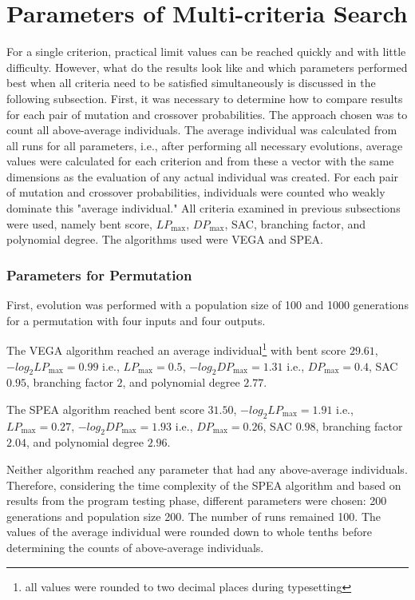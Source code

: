 \section{Parameters of Multi-criteria Search}
For a single criterion, practical limit values can be reached quickly and with little difficulty.
However, what do the results look like and which parameters performed best when
all criteria need to be satisfied simultaneously is discussed in the following subsection.
First, it was necessary to determine how to compare results for each pair of mutation and crossover probabilities.
The approach chosen was to count
all above-average individuals.
The average individual was calculated from all runs for all parameters, i.e., after performing
all necessary evolutions, average values were calculated for each criterion and from these
a vector with the same dimensions as the evaluation of any actual individual was created.
For each pair of mutation and crossover probabilities, individuals were counted
who weakly dominate this "average individual."
All criteria examined in previous subsections were used,
namely bent score, $LP_{\max}$, $DP_{\max}$, SAC, branching factor, and polynomial degree.
The algorithms used were VEGA and SPEA.

\subsubsection{Parameters for Permutation}
First, evolution was performed with a population size of 100 and 1000 generations for a permutation
with four inputs and four outputs.

The VEGA algorithm reached an average individual\footnote{all values were rounded to two decimal places during typesetting}
with bent score $29.61$,
$-log_2{LP_{\max}} = 0.99$ i.e., $LP_{\max} = 0.5$,
$-log_2{DP_{\max}} = 1.31$ i.e., $DP_{\max} = 0.4$,
SAC $0.95$,
branching factor $2$,
and polynomial degree $2.77$.

The SPEA algorithm reached
bent score $31.50$,
$-log_2{LP_{\max}} = 1.91$ i.e., $LP_{\max} = 0.27$,
$-log_2{DP_{\max}} = 1.93$ i.e., $DP_{\max} = 0.26$,
SAC $0.98$,
branching factor $2.04$,
and polynomial degree $2.96$.

Neither algorithm reached any parameter that had any above-average individuals.
Therefore, considering the time complexity of the SPEA algorithm and based on results
from the program testing phase, different parameters were chosen:
200 generations and population size 200. The number of runs remained 100.
The values of the average individual were rounded down to whole tenths
before determining the counts of above-average individuals.

